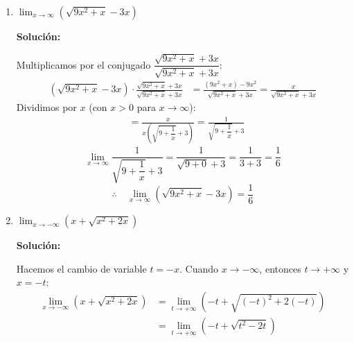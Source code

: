 \documentclass[12pt]{article}
\newcommand{\solucion}{%
    \vspace{0.8em}%
    \textbf{Solución:}%
}
\begin{document}
\begin{enumerate}[label=\alph*)]
    \solucion

    Factorizamos $x^6$ dentro de la raíz:

    \[
    \sqrt{9x^6-x}
    =
    \sqrt{x^6\left(9-\frac1{x^5}\right)}
    =
    |x^3|\sqrt{9-\frac1{x^5}}
    \]

    Como $x\to -\infty$, se tiene $x^3<0$, luego:

    \[
    |x^3|=-x^3
    \]

    Entonces:
    \begin{align*}
    \lim_{x\to-\infty}
    \frac{\sqrt{9x^6-x}}{x^3+1}
    &=
    \lim_{x\to-\infty}
    \frac{-x^3\sqrt{9-\frac1{x^5}}}{x^3+1}
    \\[6pt]
    &=
    \lim_{x\to-\infty}
    \frac{-\sqrt{9-\frac1{x^5}}}{1+\frac1{x^3}}
    \\[6pt]
    &=
    \frac{-\sqrt9}{1+0}
    \\[6pt]
    &=-3
    \end{align*}
    \[
    \therefore\quad
    \lim_{x\to-\infty}\frac{\sqrt{9x^6-x}}{x^3+1}=-3
    \]

    \item $\lim_{x \to \infty} \left(\sqrt{9x^2 + x} - 3x\right)$

    \solucion

    Multiplicamos por el conjugado $\dfrac{\sqrt{9x^2+x}+3x}{\sqrt{9x^2+x}+3x}$:
    \begin{align*}
        \left(\sqrt{9x^2+x}-3x\right)\cdot\frac{\sqrt{9x^2+x}+3x}{\sqrt{9x^2+x}+3x}
        &= \frac{(9x^2+x)-9x^2}{\sqrt{9x^2+x}+3x}
        = \frac{x}{\sqrt{9x^2+x}+3x}
    \end{align*}
    Dividimos por $x$ (con $x > 0$ para $x\to\infty$):
    \begin{align*}
        &= \frac{x}{x\left(\sqrt{9+\dfrac{1}{x}}+3\right)}
        = \frac{1}{\sqrt{9+\dfrac{1}{x}}+3}
    \end{align*}
    \[
        \lim_{x\to\infty}\frac{1}{\sqrt{9+\dfrac{1}{x}}+3}
        = \frac{1}{\sqrt{9+0}+3} = \frac{1}{3+3} = \frac{1}{6}
    \]
    \[
        \therefore\quad \lim_{x\to\infty}\left(\sqrt{9x^2+x}-3x\right) = \frac{1}{6}
    \]

    \item $\lim_{x \to -\infty} \left(x + \sqrt{x^2 + 2x}\right)$

    \solucion

    Hacemos el cambio de variable $t = -x$. Cuando $x \to -\infty$, entonces $t \to +\infty$ y $x = -t$:
    \begin{align*}
        \lim_{x\to -\infty}\left(x + \sqrt{x^2+2x}\right) 
        &= \lim_{t\to +\infty}\left(-t + \sqrt{(-t)^2+2(-t)}\right) \\
        &= \lim_{t\to +\infty}\left(-t + \sqrt{t^2-2t}\right)
    \end{align*}


\end{enumerate}
\end{document}
